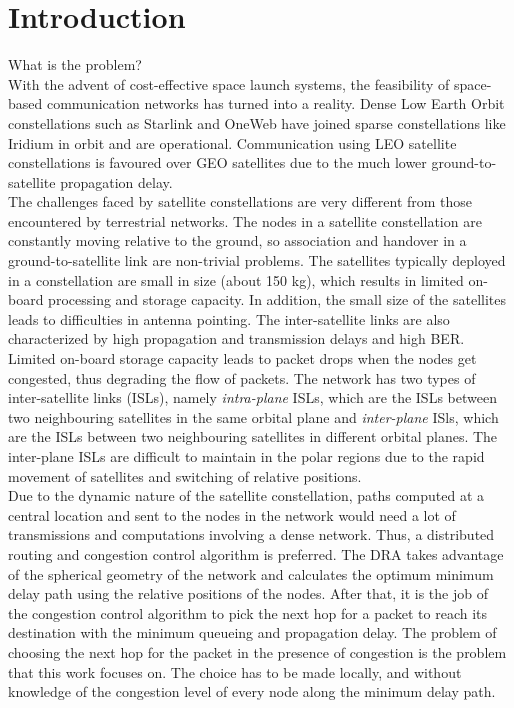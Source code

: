 \documentclass[10pt,conference, draft, letterpaper]{IEEEtran}
\newcommand{\rough}[1]{{\color{red} #1}}
\begin{document}
\section{Introduction}
\rough{What is the problem?}\\
With the advent of cost-effective space launch systems, the feasibility of space-based communication networks has turned into a reality. Dense Low Earth Orbit constellations such as Starlink and OneWeb have joined sparse constellations like Iridium in orbit and are operational. Communication using LEO satellite constellations is favoured over GEO satellites due to the much lower ground-to-satellite propagation delay. \\
The challenges faced by satellite constellations are very different from those encountered by terrestrial networks. The nodes in a satellite constellation are constantly moving relative to the ground, so association and handover in a ground-to-satellite link are non-trivial problems. The satellites typically deployed in a constellation are small in size (about 150 kg), which results in limited on-board processing and storage capacity. In addition, the small size of the satellites leads to difficulties in antenna pointing. The inter-satellite links are also characterized by high propagation and transmission delays and high BER. Limited on-board storage capacity leads to packet drops when the nodes get congested, thus degrading the flow of packets. The network has two types of inter-satellite links (ISLs), namely \textit{intra-plane} ISLs, which are the ISLs between two neighbouring satellites in the same orbital plane and \textit{inter-plane} ISls, which are the ISLs between two neighbouring satellites in different orbital planes. The inter-plane ISLs are difficult to maintain in the polar regions due to the rapid movement of satellites and switching of relative positions.\\
Due to the dynamic nature of the satellite constellation, paths computed at a central location and sent to the nodes in the network would need a lot of transmissions and computations involving a dense network. Thus, a distributed routing and congestion control algorithm is preferred. The DRA takes advantage of the spherical geometry of the network and calculates the optimum minimum delay path using the relative positions of the nodes. After that, it is the job of the congestion control algorithm to pick the next hop for a packet to reach its destination with the minimum queueing and propagation delay. The problem of choosing the next hop for the packet in the presence of congestion is the problem that this work focuses on. The choice has to be made locally, and without knowledge of the congestion level of every node along the minimum delay path.\\
\end{document}
